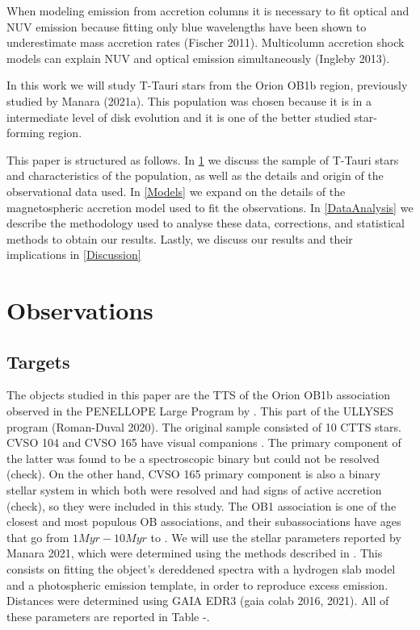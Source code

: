 \documentclass[twocolumn,linenumbers]{aastex631}
\begin{document}
When modeling emission from accretion columns it is necessary to fit optical and NUV emission because fitting only blue wavelengths have been shown to underestimate mass accretion rates (Fischer 2011). Multicolumn accretion shock models can explain NUV and optical emission simultaneously (Ingleby 2013).

In this work we will study T-Tauri stars from the Orion OB1b region, previously studied by Manara (2021a). This population was chosen because it is in a intermediate level of disk evolution and it is one of the better studied star-forming region. 

This paper is structured as follows. In \ref{Sample and observations} we discuss the sample of T-Tauri stars and characteristics of the population, as well as the details and origin of the observational data used. In \ref{Models} we expand on the details of the magnetospheric accretion model used to fit the observations. In \ref{DataAnalysis} we describe the methodology used to analyse these data, corrections, and statistical methods to obtain our results. Lastly, we discuss our results and their implications in \ref{Discussion}



\section{Observations} \label{Sample and observations}

\subsection{Targets}
The objects studied in this paper are the TTS of the Orion OB1b association observed in the PENELLOPE Large Program by \citep{manara2021}. This part of the ULLYSES program (Roman-Duval 2020). The original sample consisted of 10 CTTS stars. CVSO 104 and CVSO 165 have visual companions \citep{manara2021a}. The primary component of the latter was found to be a spectroscopic binary but could not be resolved (check). On the other hand, CVSO 165 primary component is also a binary stellar system in which both were resolved and had signs of active accretion (check), so they were included in this study. The OB1 association is one of the closest and most populous OB associations, and their subassociations have ages that go from $1Myr-10Myr$ to \citep{blaauw1994}.  We will use the stellar parameters reported by Manara 2021, which were determined using the methods described in \citep{manara2013a}. This consists on fitting the object's dereddened spectra with a hydrogen slab model and a photospheric emission template, in order to reproduce excess emission. Distances were determined using GAIA EDR3 (gaia colab 2016, 2021). All of these parameters are reported in Table -. 
\end{document}
